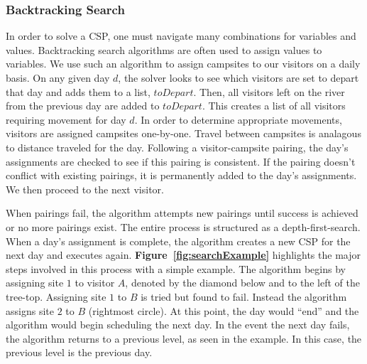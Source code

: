 \documentclass[11pt]{article} %
\begin{document}
\subsubsection{Backtracking Search}
In order to solve a CSP, one must navigate many combinations
for variables and values. Backtracking search algorithms are often used
to assign values to variables\cite{AI-Intro}.  We use such an algorithm to
assign campsites to our  visitors on a daily basis.
On any given day
$d$, the solver looks to see which visitors are set to depart that day and
adds them to a list, $toDepart$.  Then, all visitors left on the
river from the previous day are added to $toDepart$.  This creates a list of all
 visitors requiring movement for day $d$.  In order to determine
appropriate movements, visitors are assigned campsites one-by-one.  Travel
between campsites is analagous to
distance traveled for the day.  Following
a visitor-campsite pairing, the day's assignments are checked to see if this pairing is
consistent.  If the pairing doesn't conflict with
existing pairings, it is permanently added to the day's assignments.
We then proceed to the next visitor.

When pairings fail, the algorithm attempts new pairings
until success is achieved or no more pairings exist. The entire process is 
structured as a
depth-first-search. When a day's assignment is complete, the algorithm creates
a new CSP for the next day and executes again.  \textbf{Figure~\ref{fig:searchExample}}
highlights the major steps
involved in this process with a simple example.  The algorithm begins by
assigning site $1$ to visitor $A$, denoted
by the diamond below and to the left of the tree-top.  Assigning
site $1$ to $B$ is tried but found to fail.  Instead the algorithm assigns site
$2$ to $B$ (rightmost circle).  At this point, the day would ``end'' and
the algorithm would begin scheduling the next day.  In the event
the next day fails, the algorithm returns to a previous level, as
seen in the example.  In this case, the previous level is the previous day.
\end{document}
